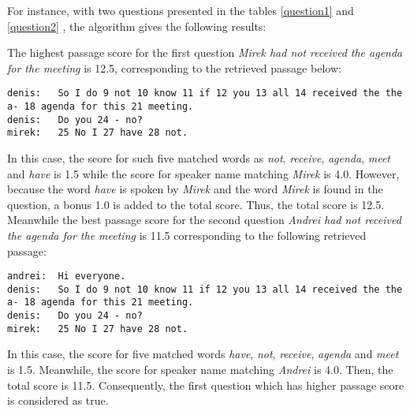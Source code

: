 For instance, with two questions presented in the tables \ref{question1} and \ref{question2} , the algorithm gives the following results: 

The highest passage score for the first question \textit{Mirek had not received the agenda for the meeting} is 12.5, corresponding to the retrieved passage below:
\scriptsize
\begin{verbatim}
denis:   So I do 9 not 10 know 11 if 12 you 13 all 14 received the the a- 18 agenda for this 21 meeting.
denis:   Do you 24 - no?
mirek:   25 No I 27 have 28 not.
\end{verbatim}
\normalsize
 In this case, the score for such five matched words as \textit{not}, \textit{receive}, \textit{agenda}, \textit{meet} and \textit{have} is 1.5 while the score for speaker name matching \textit{Mirek} is 4.0. However, because the word \textit{have} is spoken by \textit{Mirek} and the word \textit{Mirek} is found in the question, a bonus 1.0 is added to the total score. Thus, the total score is 12.5. Meanwhile the best passage score for the second question \textit{Andrei had not received the agenda for the meeting} is 11.5 corresponding to the following retrieved passage:
\scriptsize
\begin{verbatim}
andrei:  Hi everyone.
denis:   So I do 9 not 10 know 11 if 12 you 13 all 14 received the the a- 18 agenda for this 21 meeting.
denis:   Do you 24 - no?
mirek:   25 No I 27 have 28 not.
\end{verbatim}
\normalsize
In this case, the score for five matched words \textit{have}, \textit{not}, \textit{receive}, \textit{agenda} and \textit{meet} is 1.5. Meanwhile, the score for speaker name matching \textit{Andrei} is 4.0. Then, the total score is 11.5. Consequently, the first question which has higher passage score is considered as true.



